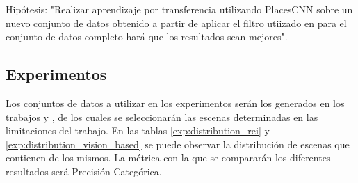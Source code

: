 Hipótesis: "Realizar aprendizaje por transferencia utilizando PlacesCNN sobre un nuevo conjunto de datos obtenido a partir de aplicar el filtro utiizado en \cite{lstm_real_estate} para el conjunto de datos completo hará que los resultados sean mejores".










\subsection{Experimentos}
Los conjuntos de datos a utilizar en los experimentos serán los generados en los trabajos \cite{vision_based_real_estate_price_estimation} y \cite{lstm_real_estate}, de los cuales se seleccionarán las escenas determinadas en las limitaciones del trabajo. En las tablas \ref{exp:distribution_rei} y \ref{exp:distribution_vision_based} se puede observar la distribución de escenas que contienen de los mismos. La métrica con la que se compararán los diferentes resultados será Precisión Categórica.

